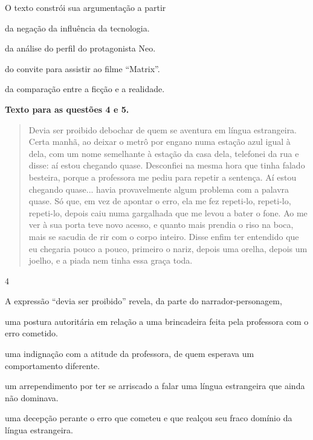 
O texto constrói sua argumentação a partir

\begin{escolha}
\item da negação da influência da tecnologia.

\item da análise do perfil do protagonista Neo.

\item do convite para assistir ao filme ``Matrix''.

\item da comparação entre a ficção e a realidade.
\end{escolha}

\textbf{Texto para as questões 4 e 5.}

\begin{quote}
Devia ser proibido debochar de quem se aventura em língua estrangeira.
Certa manhã, ao deixar o metrô por engano numa estação azul igual à
dela, com um nome semelhante à estação da casa dela, telefonei da rua e
disse: aí estou chegando quase. Desconfiei na mesma hora que tinha
falado besteira, porque a professora me pediu para repetir a sentença.
Aí estou chegando quase... havia provavelmente algum problema com a
palavra quase. Só que, em vez de apontar o erro, ela me fez repeti-lo,
repeti-lo, repeti-lo, depois caiu numa gargalhada que me levou a bater o
fone. Ao me ver à sua porta teve novo acesso, e quanto mais prendia o
riso na boca, mais se sacudia de rir com o corpo inteiro. Disse enfim
ter entendido que eu chegaria pouco a pouco, primeiro o nariz, depois
uma orelha, depois um joelho, e a piada nem tinha essa graça toda.
\end{quote}


\num{4}

A expressão ``devia ser proibido'' revela, da parte do
narrador-personagem,

\begin{escolha}
\item uma postura autoritária em relação a uma brincadeira feita pela
professora com o erro cometido.

\item uma indignação com a atitude da professora, de quem esperava um
comportamento diferente.

\item um arrependimento por ter se arriscado a falar uma língua estrangeira
que ainda não dominava.

\item uma decepção perante o erro que cometeu e que realçou seu fraco
domínio da língua estrangeira.
\end{escolha}

